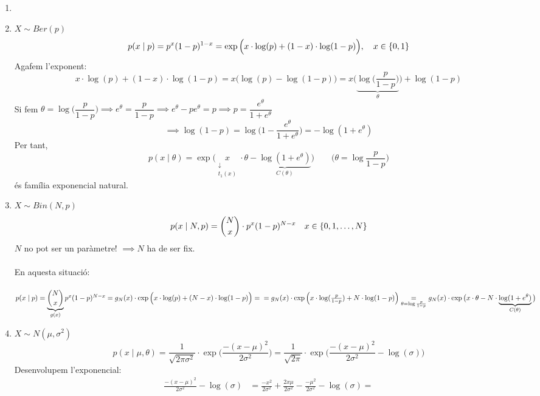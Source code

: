 \begin{example}
  \begin{enumerate}
  \item[]
      \item $X\sim Ber(p)$
      \[
        p(x\mid p) = p^{x}(1-p)^{1-x} = \exp\Big(x\cdot \log(p) + (1-x)\cdot \log(1-p)\Big), \quad x\in\left\{0,1\right\}
      \]
      Agafem l'exponent:
      \[
        x\cdot \log(p) + (1-x)\cdot \log(1-p) = x\Big(\log(p) - \log(1-p)\Big) = x\bigg(\underbrace{\log\Big(\frac{p}{1-p}\Big)}_{\theta} \bigg) + \log(1-p)
      \]
      Si fem $\theta = \log\Big(\dfrac{p}{1-p}\Big) \implies e^{\theta} = \dfrac{p}{1-p} \implies e^{\theta} - pe^{\theta} = p \implies p = \dfrac{e^{\theta}}{1+e^{\theta}}$
      \[
        \implies \log(1-p) = \log\bigg(1-\frac{e^{\theta}}{1+e^{\theta}}\bigg) = -\log(1+e^{\theta})
      \]
      Per tant, 
      \[
        p(x\mid \theta) = \exp\Big(\underset{\substack{\downarrow \\ t_{1}(x)}}{x}\cdot\theta - \underbrace{\log(1+e^{\theta})}_{C(\theta)}\Big) \qquad \bigg(\theta = \log\frac{p}{1-p}\bigg)
      \]
      és família exponencial natural.
      \item $X\sim Bin(N,p)$
      \[
        p(x\mid N,p) = \binom{N}{x}\cdot p^{x}(1-p)^{N-x} \quad x \in \left\{0,1,\ldots,N\right\}
      \]
      $N$ no pot ser un paràmetre! $\implies N$ ha de ser fix. \\\\
      En aquesta situació: \\\\
      $
        p(x\mid p) = \underbrace{\binom{N}{x}}_{g(x)} p^{x}(1-p)^{N-x} = g_{N}(x)\cdot \exp\Big(x\cdot \log(p) + (N-x)\cdot \log(1-p)\Big) = \\=g_{N}(x)\cdot \exp\Big(x\cdot \log(\frac{p}{1-p}) + N\cdot \log(1-p)\Big) \underset{\theta = \log\frac{p}{1-p}}{=}
        g_{N}(x)\cdot \exp\big(x\cdot\theta - N\cdot \underbrace{\log(1+e^{\theta})}_{C(\theta)}\big)
      $
      \item $X\sim N(\mu, \sigma^{2})$
      \[
        p(x\mid \mu, \theta) = \frac{1}{\sqrt{2\pi\sigma^{2}}}\cdot \exp\bigg(\frac{-(x-\mu)^{2}}{2\sigma^{2}}\bigg) = \frac{1}{\sqrt{2\pi}}\cdot \exp\bigg(\frac{-(x-\mu)^{2}}{2\sigma^{2}}-\log(\sigma)\bigg)
      \]
      Desenvolupem l'exponencial:
      \[
      \begin{split}
          \frac{-(x-\mu)^{2}}{2\sigma^{2}}-\log(\sigma) &= \frac{-x^{2}}{2\sigma^{2}}+\frac{2x\mu}{2\sigma^{2}}-\frac{-\mu^{2}}{2\sigma^{2}}-\log(\sigma) = \\

\end{split}\]
\end{enumerate}
\end{example}
